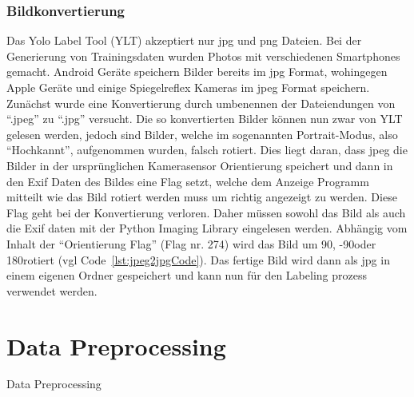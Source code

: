 \documentclass[a4paper,oneside,12pt]{report}
\begin{document}
\begin{onehalfspace}
			\subsection{Bildkonvertierung}
				Das Yolo Label Tool (YLT) akzeptiert nur jpg und png Dateien. Bei der Generierung von Trainingsdaten wurden Photos mit verschiedenen Smartphones gemacht. Android Geräte speichern Bilder bereits im jpg Format, wohingegen Apple Geräte und einige Spiegelreflex Kameras im jpeg Format speichern. Zunächst wurde eine Konvertierung durch umbenennen der Dateiendungen von "`.jpeg"' zu "`.jpg"' versucht. Die so konvertierten Bilder können nun zwar von YLT gelesen werden, jedoch sind Bilder, welche im sogenannten Portrait-Modus, also "`Hochkannt"', aufgenommen wurden, falsch rotiert. Dies liegt daran, dass jpeg die Bilder in der ursprünglichen Kamerasensor Orientierung speichert und dann in den Exif Daten des Bildes eine Flag setzt, welche dem Anzeige Programm mitteilt wie das Bild rotiert werden muss um richtig angezeigt zu werden. Diese Flag geht bei der Konvertierung verloren. Daher müssen sowohl das Bild als auch die Exif daten mit der Python Imaging Library eingelesen werden. Abhängig vom Inhalt der "`Orientierung Flag"' (Flag nr. 274) wird das Bild um 90\degree, -90\degree oder 180\degree rotiert (vgl Code~\ref{lst:jpeg2jpgCode}). Das fertige Bild wird dann als jpg in einem eigenen Ordner gespeichert und kann nun für den Labeling prozess verwendet werden.
				
			
	\end{onehalfspace}
	\chapter{Data Preprocessing}
	\begin{onehalfspace}
		Data Preprocessing
	\end{onehalfspace}
\end{document}
